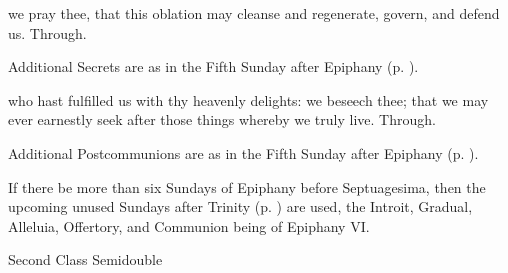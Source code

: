 \secret
{} we pray thee, that this oblation may cleanse and regenerate, govern, and defend us. Through.
\begin{rubric}
    Additional Secrets are as in the Fifth Sunday after Epiphany (p. \pageref{EpiphanyV}).
\end{rubric}
\postcommunion
{} who hast fulfilled us with thy heavenly delights: we beseech thee; that we may ever earnestly seek after those things whereby we truly live. Through.
\begin{rubric}
    Additional Postcommunions are as in the Fifth Sunday after Epiphany (p. \pageref{EpiphanyV}).
\end{rubric}
\begin{rubric}
    If there be more than six Sundays of Epiphany before Septuagesima, then the upcoming unused Sundays after Trinity (p. \pageref{trinity}) are used, the Introit, Gradual, Alleluia, Offertory, and Communion being of Epiphany VI.
\end{rubric}

\begin{inhead}
{Second Class Semidouble}
\end{inhead}
\par\noindent
{}


